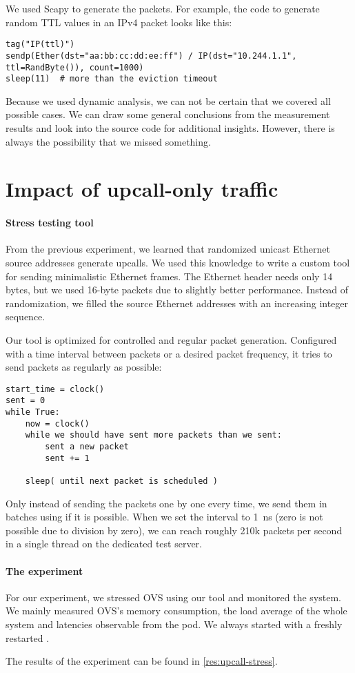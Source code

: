 We used Scapy to generate the packets. For example, the code to generate random TTL values in an IPv4 packet looks like this:

\begin{verbatim}
tag("IP(ttl)")
sendp(Ether(dst="aa:bb:cc:dd:ee:ff") / IP(dst="10.244.1.1", ttl=RandByte()), count=1000)
sleep(11)  # more than the eviction timeout
\end{verbatim}

Because we used dynamic analysis, we can not be certain that we covered all possible cases. We can draw some general conclusions from the measurement results and look into the source code for additional insights. However, there is always the possibility that we missed something.

\section{Impact of upcall-only traffic}
\label{design:upcall-impact}

\paragraph{Stress testing tool}
From the previous experiment, we learned that randomized unicast Ethernet source addresses generate upcalls. We used this knowledge to write a custom tool for sending minimalistic Ethernet frames. The Ethernet header needs only 14 bytes, but we used 16-byte packets due to slightly better performance. Instead of randomization, we filled the source Ethernet addresses with an increasing integer sequence.

Our tool is optimized for controlled and regular packet generation. Configured with a time interval between packets or a desired packet frequency, it tries to send packets as regularly as possible:

\begin{verbatim}
start_time = clock()
sent = 0
while True:
    now = clock()
    while we should have sent more packets than we sent:
        sent a new packet
        sent += 1
    
    sleep( until next packet is scheduled )
\end{verbatim}

Only instead of sending the packets one by one every time, we send them in batches using  if it is possible. When we set the interval to \qty{1}{\ns} (zero is not possible due to division by zero), we can reach roughly 210k packets per second in a single thread on the dedicated test server.

\paragraph{The experiment}
For our experiment, we stressed OVS using our tool and monitored the system. We mainly measured OVS's memory consumption, the load average of the whole system and latencies observable from the  pod. We always started with a freshly restarted .

The results of the experiment can be found in \cref{res:upcall-stress}.
